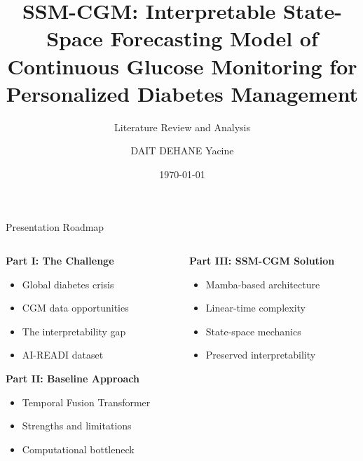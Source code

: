 \documentclass[aspectratio=169,xcolor=dvipsnames]{beamer}
\title{SSM-CGM: Interpretable State-Space Forecasting Model of Continuous Glucose Monitoring for Personalized Diabetes Management}
\subtitle{Literature Review and Analysis}
\author{DAIT DEHANE Yacine}
\institute
{
    Supervised by \\
    - Pr Henni Khadidja (TÉLUQ)\\
    - Dr Khalid Benabdeslem (Université de Lyon)
}
\date{\today}
\begin{document}
\begin{frame}
    \titlepage
\end{frame}
\begin{frame}{Presentation Roadmap}
 
    
     
    \begin{columns}[t]
        \begin{column}{0.48\textwidth}
            \begin{block}{\textbf{Part I: The Challenge}}
                \begin{itemize}
                    \item Global diabetes crisis
                    \item CGM data opportunities
                    \item The interpretability gap
                    \item AI-READI dataset
                \end{itemize}
            \end{block}
            
            \vspace{0.3em}
            
            \begin{block}{\textbf{Part II: Baseline Approach}}
                \begin{itemize}
                    \item Temporal Fusion Transformer
                    \item Strengths and limitations
                    \item Computational bottleneck
                \end{itemize}
            \end{block}
        \end{column}
        
        \begin{column}{0.48\textwidth}
            \begin{block}{\textbf{Part III: SSM-CGM Solution}}
                \begin{itemize}
                    \item Mamba-based architecture
                    \item Linear-time complexity
                    \item State-space mechanics
                    \item Preserved interpretability
                \end{itemize}
            \end{block}
            

\end{column}
\end{columns}
\end{frame}
\end{document}
